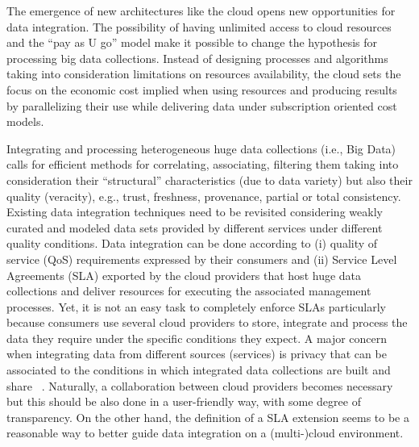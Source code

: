 The emergence of new architectures like the cloud opens new opportunities for data integration. 
The possibility of having unlimited access to cloud resources and the ``pay as U go'' model make it possible to change the hypothesis for processing big  data collections.  Instead of designing processes and algorithms taking into consideration  limitations on resources availability, the cloud sets the focus on the economic cost implied when using resources and producing results by parallelizing their use while delivering data under subscription oriented cost models.
 
Integrating and processing heterogeneous huge data collections (i.e., Big Data) calls for efficient methods for correlating, associating, filtering them taking into consideration their ``structural'' characteristics (due to data variety) but also their quality (veracity), e.g., trust, freshness, provenance, partial or total consistency. 
Existing data integration techniques need to be revisited considering weakly curated and modeled data sets provided by different services under different quality conditions. Data integration can be done according to  (i) quality of service (QoS) requirements expressed by their consumers and (ii) Service Level Agreements (SLA)  exported by the cloud providers that host  huge data collections and deliver resources for executing the associated management processes. 
Yet, it is not an easy task to completely enforce SLAs particularly because
consumers use several cloud providers to store, integrate and process the data
they require under the specific conditions they expect. A major concern when
integrating data from different sources (services) is privacy that can be
associated to the conditions in which integrated data collections are built and
share ~\cite{YauY08}.     
Naturally, a collaboration between cloud providers becomes necessary~\cite{036}
but this should be also done in a user-friendly way, with some degree of
transparency. On the other hand, the definition of a SLA extension seems to be
a reasonable way to better guide data integration on a (multi-)cloud
environment.

%


 

